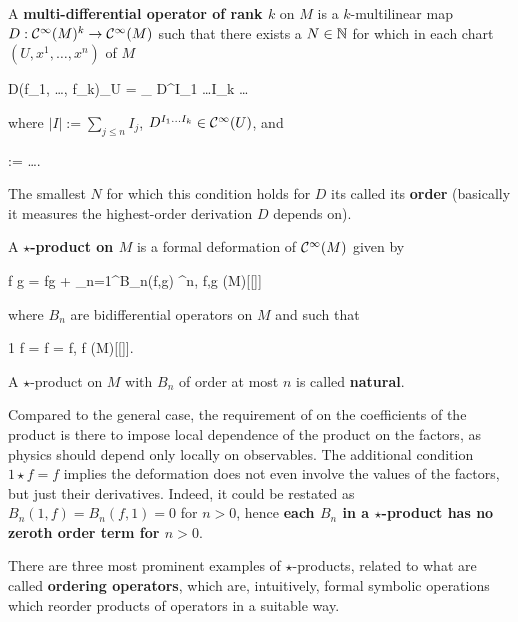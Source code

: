 \documentclass[main.tex]{subfiles}
\begin{document}
\begin{definition}
	A \textbf{multi-differential operator of rank $k$} on $M$ is a $k$-multilinear map $D:\mathcal{C}^\infty(M)^k \to \mathcal{C}^\infty(M)$ such that there exists a $N \in \mathbb{N}$ for which in each chart $(U, x^1, \ldots, x^n)$ of $M$
	\begin{eqalign}
		D(f_1, \ldots, f_k)\vert_U = \sum_{} D^{I_1 \ldots I_k}  \ldots {}
	\end{eqalign}
	where $|I| := \sum_{j \leq n} I_j$, $D^{I_1 \ldots I_k} \in \mathcal{C}^\infty(U)$, and
	\begin{eqalign}
		 :=  \ldots \pder{^{I_n}}{(x^n)^{I_n}}.
	\end{eqalign}
	The smallest $N$ for which this condition holds for $D$ its called its \textbf{order} (basically it measures the highest-order derivation $D$ depends on).
\end{definition}

\begin{definition}
	A \textbf{$\star$-product on $M$} is a formal deformation of $\mathcal{C}^\infty(M)$ given by
	\begin{eqalign}
		f \star g = fg + \sum_{n=1}^\infty B_n(f,g) \planck^n, \quad f,g \in \Cinfty(M)[[\planck]]
	\end{eqalign}
	where $B_n$ are bidifferential operators on $M$ and such that
	\begin{eqalign}
	\label{eq:star_pr_id_axiom}
		1 \star f = f  = f, \quad \forall f \in \Cinfty(M)[[\planck]].
	\end{eqalign}
	A $\star$-product on $M$ with $B_n$ of order at most $n$ is called \textbf{natural}.
\end{definition}

\begin{remark}
\label{rmk:no_zeroth_order}
	Compared to the general case, the requirement of on the coefficients of the product is there to impose local dependence of the product on the factors, as physics should depend only locally on observables. The additional condition $1 \star f=f$ implies the deformation does not even involve the values of the factors, but just their derivatives. Indeed, it could be restated as $B_n(1,f) = B_n(f,1) =0$ for $n>0$, hence \textbf{each $B_n$ in a $\star$-product has no zeroth order term for $n > 0$}.
\end{remark}

There are three most prominent examples of $\star$-products, related to what are called \textbf{ordering operators}, which are, intuitively, formal symbolic operations which reorder products of operators in a suitable way.
\end{document}

